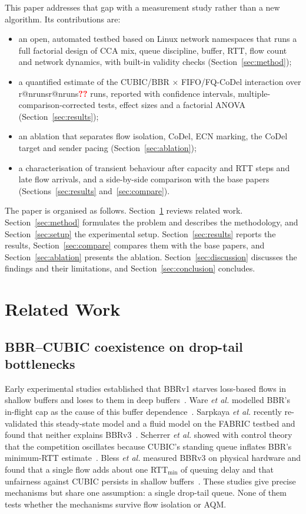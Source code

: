 \documentclass[conference]{IEEEtran}
\makeatletter
\newcommand{\R}[1]{\ifcsname r@#1\endcsname\csname r@#1\endcsname\else\textcolor{red}{\textbf{??}}\fi}
\makeatother
\begin{document}
This paper addresses that gap with a measurement study rather than a new algorithm. Its contributions are:
\begin{itemize}
  \item an open, automated testbed based on Linux network namespaces that runs a full factorial design of CCA mix, queue discipline, buffer, RTT, flow count and network dynamics, with built-in validity checks (Section~\ref{sec:method});
  \item a quantified estimate of the CUBIC/BBR $\times$ FIFO/FQ-CoDel interaction over \R{nruns} runs, reported with confidence intervals, multiple-comparison-corrected tests, effect sizes and a factorial ANOVA (Section~\ref{sec:results});
  \item an ablation that separates flow isolation, CoDel, ECN marking, the CoDel target and sender pacing (Section~\ref{sec:ablation});
  \item a characterisation of transient behaviour after capacity and RTT steps and late flow arrivals, and a side-by-side comparison with the base papers (Sections~\ref{sec:results} and~\ref{sec:compare}).
\end{itemize}

The paper is organised as follows. Section~\ref{sec:related} reviews related work. Section~\ref{sec:method} formulates the problem and describes the methodology, and Section~\ref{sec:setup} the experimental setup. Section~\ref{sec:results} reports the results, Section~\ref{sec:compare} compares them with the base papers, and Section~\ref{sec:ablation} presents the ablation. Section~\ref{sec:discussion} discusses the findings and their limitations, and Section~\ref{sec:conclusion} concludes.

\section{Related Work}
\label{sec:related}

\subsection{BBR--CUBIC coexistence on drop-tail bottlenecks}
Early experimental studies established that BBRv1 starves loss-based flows in shallow buffers and loses to them in deep buffers~\cite{hock2017bbr,cao2019bbr}. Ware \emph{et al.} modelled BBR's in-flight cap as the cause of this buffer dependence~\cite{ware2019modeling}. Sarpkaya \emph{et al.} recently re-validated this steady-state model and a fluid model on the FABRIC testbed and found that neither explains BBRv3~\cite{sarpkaya2025sharing}. Scherrer \emph{et al.} showed with control theory that the competition oscillates because CUBIC's standing queue inflates BBR's minimum-RTT estimate~\cite{scherrer2026control}. Bless \emph{et al.} measured BBRv3 on physical hardware and found that a single flow adds about one RTT$_{\min}$ of queuing delay and that unfairness against CUBIC persists in shallow buffers~\cite{bless2025bbrv3}. These studies give precise mechanisms but share one assumption: a single drop-tail queue. None of them tests whether the mechanisms survive flow isolation or AQM.
\end{document}
